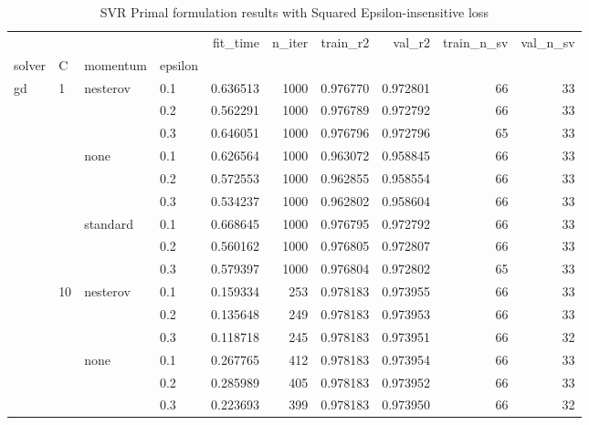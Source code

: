 \begin{table}[H]
\centering
\caption{SVR Primal formulation results with Squared Epsilon-insensitive loss}
\label{primal_svr_squared_eps_cv_results}
\begin{tabular}{llllrrrrrr}
\toprule
          &     &   &     &  fit\_time &  n\_iter &  train\_r2 &    val\_r2 &  train\_n\_sv &  val\_n\_sv \\
solver & C & momentum & epsilon &           &         &           &           &             &           \\
\midrule
gd & 1   & nesterov & 0.1 &  0.636513 &    1000 &  0.976770 &  0.972801 &          66 &        33 \\
          &     &   & 0.2 &  0.562291 &    1000 &  0.976789 &  0.972792 &          66 &        33 \\
          &     &   & 0.3 &  0.646051 &    1000 &  0.976796 &  0.972796 &          65 &        33 \\
          &     & none & 0.1 &  0.626564 &    1000 &  0.963072 &  0.958845 &          66 &        33 \\
          &     &   & 0.2 &  0.572553 &    1000 &  0.962855 &  0.958554 &          66 &        33 \\
          &     &   & 0.3 &  0.534237 &    1000 &  0.962802 &  0.958604 &          66 &        33 \\
          &     & standard & 0.1 &  0.668645 &    1000 &  0.976795 &  0.972792 &          66 &        33 \\
          &     &   & 0.2 &  0.560162 &    1000 &  0.976805 &  0.972807 &          66 &        33 \\
          &     &   & 0.3 &  0.579397 &    1000 &  0.976804 &  0.972802 &          65 &        33 \\
          & 10  & nesterov & 0.1 &  0.159334 &     253 &  0.978183 &  0.973955 &          66 &        33 \\
          &     &   & 0.2 &  0.135648 &     249 &  0.978183 &  0.973953 &          66 &        33 \\
          &     &   & 0.3 &  0.118718 &     245 &  0.978183 &  0.973951 &          66 &        32 \\
          &     & none & 0.1 &  0.267765 &     412 &  0.978183 &  0.973954 &          66 &        33 \\
          &     &   & 0.2 &  0.285989 &     405 &  0.978183 &  0.973952 &          66 &        33 \\
          &     &   & 0.3 &  0.223693 &     399 &  0.978183 &  0.973950 &          66 &        32 \\

\end{tabular}
\end{table}
